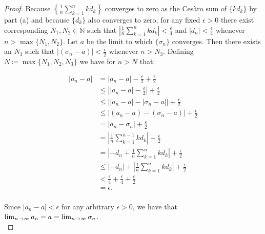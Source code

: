 \begin{proof}
        \pagebreak
        Because
        $\left\{\frac{1}{n}\sum\limits_{k=1}^{n}{kd_k}\right\}$ converges to
        zero as the Cesàro sum of $\{kd_k\}$ by part (a) and because $\{d_k\}$
        also converges to zero\footnotemark[3], for any fixed $\epsilon > 0$
        there exist corresponding $N_1, N_2 \in \mathbb{N}$ such that
        $\left|\frac{1}{n}\sum\limits_{k=1}^{n}{kd_k}\right| < \frac{\epsilon}{4}$
        and $|d_n| < \frac{\epsilon}{4}$ whenever $n > \max{\{N_1, N_2\}}$. Let
        $a$ be the limit to which $\{\sigma_n\}$ converges. Then there exists
        an $N_3$ such that $|(\sigma_n - a)| < \frac{\epsilon}{2}$ whenever
        $n > N_3$. Defining $N \coloneqq \max{\{N_1, N_2, N_3}\}$ we have for
        $n > N$ that:


        \begin{align*}
            |a_n - a| &= |a_n - a| - \frac{\epsilon}{2} + \frac{\epsilon}{2} \\
                      &\le \left| |a_n - a| - \frac{\epsilon}{2}\right| + \frac{\epsilon}{2}  \\
                      &\le \Big| |a_n - a | - |\sigma_n - a| \Big| + \frac{\epsilon}{2}  \\
                      &\le |(a_n - a ) - (\sigma_n - a)| + \frac{\epsilon}{2} \\
                      &= |a_n - \sigma_n| + \frac{\epsilon}{2} \\
                      &= \left|\frac{1}{n}\sum\limits_{k=1}^{n-1}{kd_k}\right| + \frac{\epsilon}{2} \\
                      &= \left| -d_n + \frac{1}{n}\sum\limits_{k=1}^{n}{kd_k} \right| + \frac{\epsilon}{2} \\
                      &\le |-d_n| + \left|\frac{1}{n}\sum\limits_{k=1}^{n}{kd_k}\right| + \frac{\epsilon}{2} \\
                      &< \frac{\epsilon}{4} + \frac{\epsilon}{4} + \frac{\epsilon}{2} \\
                      &= \epsilon. \\
        \end{align*}

        Since $|a_n - a| < \epsilon$ for any arbitrary $\epsilon > 0$, we have
        that  ${\lim_{n \rightarrow \infty}{a_n}} = a = {\lim_{n \rightarrow \infty}{\sigma_n}}$.
        \\
        \renewcommand*{\thefootnote}{\arabic{footnote}}

    \end{proof}